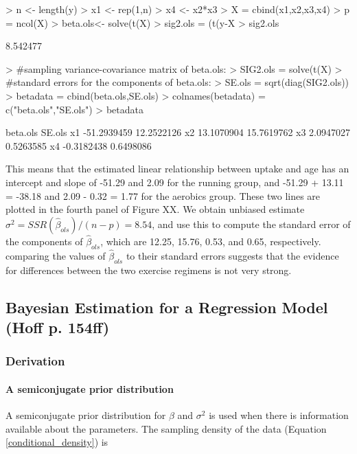 \documentclass[12pt, a4paper]{article}
\begin{document}
\begin{Schunk}
\begin{Sinput}
> n <- length(y)
> x1 <- rep(1,n)
> x4 <- x2*x3
> X = cbind(x1,x2,x3,x4)
> p = ncol(X)
> beta.ols<- solve(t(X)%
> sig2.ols = (t(y-X%
> sig2.ols
\end{Sinput}
\begin{Soutput}
[1] 8.542477
\end{Soutput}
\begin{Sinput}
> #sampling variance-covariance matrix of beta.ols:
> SIG2.ols = solve(t(X)%
> #standard errors for the components of beta.ols:
> SE.ols = sqrt(diag(SIG2.ols))
> betadata = cbind(beta.ols,SE.ols)
> colnames(betadata) = c("beta.ols","SE.ols")
> betadata
\end{Sinput}
\begin{Soutput}
      beta.ols     SE.ols
x1 -51.2939459 12.2522126
x2  13.1070904 15.7619762
x3   2.0947027  0.5263585
x4  -0.3182438  0.6498086
\end{Soutput}
\end{Schunk}

This means that the estimated linear relationship between uptake and age has an intercept and slope of -51.29 and 2.09 for the running group, and -51.29 + 13.11 = -38.18 and 2.09 - 0.32 = 1.77 for the aerobics group.  These two lines are plotted in the fourth panel of Figure XX.  We obtain unbiased estimate $\sigma^2 = SSR(\hat{\beta}_{ols})/(n-p) = 8.54$, and use this to compute the standard error of the components of $\hat{\beta}_{ols}$, which are 12.25, 15.76, 0.53, and 0.65, respectively.  comparing the values of $\hat{\beta}_{ols}$ to their standard errors suggests that the evidence for differences between the two exercise regimens is not very strong.

\clearpage

  \subsection{Bayesian Estimation for a Regression Model (Hoff p. 154ff)}

  \subsubsection{Derivation}

    \paragraph{A semiconjugate prior distribution}
    A semiconjugate prior distribution for $\beta$ and $\sigma^2$ is used when there is information available about the parameters.  The sampling density of the data (Equation \ref{conditional_density}) is
\end{document}

